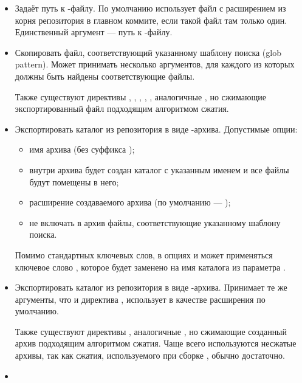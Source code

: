 \begin{itemize}
	\item {}
	
	Задаёт путь к -файлу. По умолчанию  использует файл с
		расширением  из корня репозитория в главном коммите,
		если такой файл там только один. Единственный аргумент --- путь к -файлу.
	
	\item {}
	Скопировать файл, соответствующий указанному шаблону поиска (glob pattern).
		Может принимать несколько аргументов, для каждого из которых должны
		быть найдены соответствующие файлы.
	
	Также существуют директивы , , , , ,
		аналогичные , но сжимающие экспортированный файл подходящим алгоритмом сжатия.
	\item  {}

	Экспортировать каталог из репозитория в виде -архива. Допустимые опции:
	\begin{itemize}
		\item {} имя архива (без суффикса );
		\item {} внутри архива будет создан каталог с указанным именем
			и все файлы будут помещены в него;
		\item {} расширение создаваемого архива (по умолчанию --- );
		\item {} не включать в архив файлы, соответствующие указанному шаблону поиска.
	\end{itemize}
	
	Помимо стандартных ключевых слов, в опциях  и  может применяться ключевое
		слово , которое будет заменено на имя каталога из параметра .
	\item {}
	
	Экспортировать каталог из репозитория в виде -архива. Принимает те же аргументы,
		что и директива , использует  в качестве расширения по умолчанию.
	
	Также существуют директивы , аналогичные
		, но сжимающие созданный архив подходящим алгоритмом сжатия. Чаще всего используются
		несжатые архивы, так как сжатия, используемого при сборке , обычно достаточно.
	\item  {}
	

\end{itemize}
